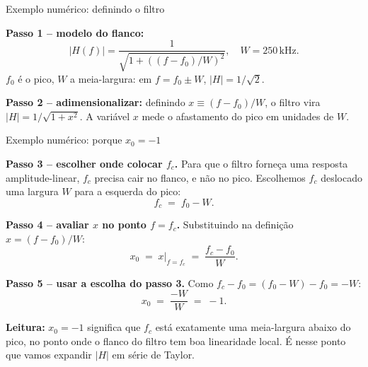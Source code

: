 \begin{frame}{Exemplo numérico: definindo o filtro}

\footnotesize
\textbf{Passo 1 -- modelo do flanco:}
\[
|H(f)| = \frac{1}{\sqrt{1 + ((f-f_0)/W)^2}}, \quad W = 250\,\text{kHz}.
\]
$f_0$ é o pico, $W$ a meia-largura: em $f = f_0 \pm W$, $|H| = 1/\sqrt{2}$.

\pause
\textbf{Passo 2 -- adimensionalizar:} definindo $x \equiv (f - f_0)/W$, o filtro vira $|H| = 1/\sqrt{1 + x^2}$. A variável $x$ mede o afastamento do pico em unidades de $W$.

\begin{center}
\end{center}

\end{frame}


\begin{frame}{Exemplo numérico: porque $x_0 = -1$}

\small
\textbf{Passo 3 -- escolher onde colocar $f_c$.} Para que o filtro forneça uma resposta amplitude-linear, $f_c$ precisa cair no flanco, e não no pico. Escolhemos $f_c$ deslocado uma largura $W$ para a esquerda do pico:
\[
f_c \;=\; f_0 - W.
\]

\pause
\vspace{0.15cm}
\textbf{Passo 4 -- avaliar $x$ no ponto $f = f_c$.} Substituindo na definição $x = (f - f_0)/W$:
\[
x_0 \;=\; \left.x\right|_{f = f_c} \;=\; \frac{f_c - f_0}{W}.
\]

\pause
\textbf{Passo 5 -- usar a escolha do passo 3.} Como $f_c - f_0 = (f_0 - W) - f_0 = -W$:
\[
x_0 \;=\; \frac{-W}{W} \;=\; -1.
\]

\pause
\vspace{0.1cm}
\textbf{Leitura:} $x_0 = -1$ significa que $f_c$ está exatamente uma meia-largura abaixo do pico, no ponto onde o flanco do filtro tem boa linearidade local. É nesse ponto que vamos expandir $|H|$ em série de Taylor.

\end{frame}

